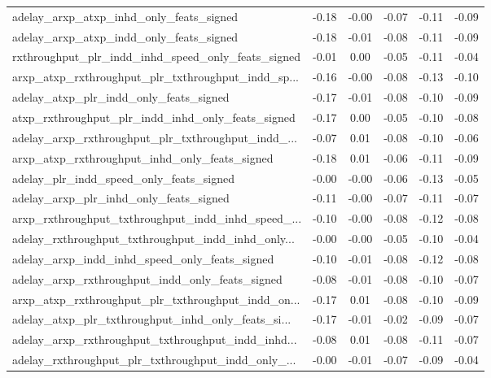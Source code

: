 \begin{tabular}{|l|*{4}{c}|r|}
adelay\_arxp\_atxp\_inhd\_only\_feats\_signed            & -0.18 & -0.00 &   -0.07 &      -0.11 & -0.09 \\
adelay\_arxp\_atxp\_indd\_only\_feats\_signed            & -0.18 & -0.01 &   -0.08 &      -0.11 & -0.09 \\
rxthroughput\_plr\_indd\_inhd\_speed\_only\_feats\_signed & -0.01 &  0.00 &   -0.05 &      -0.11 & -0.04 \\
arxp\_atxp\_rxthroughput\_plr\_txthroughput\_indd\_sp... & -0.16 & -0.00 &   -0.08 &      -0.13 & -0.10 \\
adelay\_atxp\_plr\_indd\_only\_feats\_signed             & -0.17 & -0.01 &   -0.08 &      -0.10 & -0.09 \\
atxp\_rxthroughput\_plr\_indd\_inhd\_only\_feats\_signed  & -0.17 &  0.00 &   -0.05 &      -0.10 & -0.08 \\
adelay\_arxp\_rxthroughput\_plr\_txthroughput\_indd\_... & -0.07 &  0.01 &   -0.08 &      -0.10 & -0.06 \\
arxp\_atxp\_rxthroughput\_inhd\_only\_feats\_signed      & -0.18 &  0.01 &   -0.06 &      -0.11 & -0.09 \\
adelay\_plr\_indd\_speed\_only\_feats\_signed            & -0.00 & -0.00 &   -0.06 &      -0.13 & -0.05 \\
adelay\_arxp\_plr\_inhd\_only\_feats\_signed             & -0.11 & -0.00 &   -0.07 &      -0.11 & -0.07 \\
arxp\_rxthroughput\_txthroughput\_indd\_inhd\_speed\_... & -0.10 & -0.00 &   -0.08 &      -0.12 & -0.08 \\
adelay\_rxthroughput\_txthroughput\_indd\_inhd\_only... & -0.00 & -0.00 &   -0.05 &      -0.10 & -0.04 \\
adelay\_arxp\_indd\_inhd\_speed\_only\_feats\_signed      & -0.10 & -0.01 &   -0.08 &      -0.12 & -0.08 \\
adelay\_arxp\_rxthroughput\_indd\_only\_feats\_signed    & -0.08 & -0.01 &   -0.08 &      -0.10 & -0.07 \\
arxp\_atxp\_rxthroughput\_plr\_txthroughput\_indd\_on... & -0.17 &  0.01 &   -0.08 &      -0.10 & -0.09 \\
adelay\_atxp\_plr\_txthroughput\_inhd\_only\_feats\_si... & -0.17 & -0.01 &   -0.02 &      -0.09 & -0.07 \\
adelay\_arxp\_rxthroughput\_txthroughput\_indd\_inhd... & -0.08 &  0.01 &   -0.08 &      -0.11 & -0.07 \\
adelay\_rxthroughput\_plr\_txthroughput\_indd\_only\_... & -0.00 & -0.01 &   -0.07 &      -0.09 & -0.04 \\

\end{tabular}
